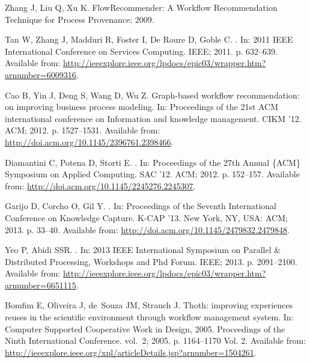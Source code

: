 \documentclass[10pt,letterpaper]{article}
\begin{document}
\begin{thebibliography}{10}
	Zhang J, Liu Q, Xu K. FlowRecommender: A Workflow Recommendation Technique for
	Process Provenance; 2009.
	
	Tan W, Zhang J, Madduri R, Foster I, {De Roure} D, Goble C.
	.
	\newblock In: 2011 IEEE International Conference on Services Computing. IEEE;
	2011. p. 632--639.
	\newblock Available from:
	\url{http://ieeexplore.ieee.org/lpdocs/epic03/wrapper.htm?arnumber=6009316}.
	
	Cao B, Yin J, Deng S, Wang D, Wu Z.
	\newblock Graph-based workflow recommendation: on improving business process
	modeling.
	\newblock In: Proceedings of the 21st ACM international conference on
	Information and knowledge management. CIKM '12. ACM; 2012. p. 1527--1531.
	\newblock Available from: \url{http://doi.acm.org/10.1145/2396761.2398466}.
	
	Diamantini C, Potena D, Storti E.
	.
	\newblock In: Proceedings of the 27th Annual \{ACM\} Symposium on Applied
	Computing. SAC '12. ACM; 2012. p. 152--157.
	\newblock Available from: \url{http://doi.acm.org/10.1145/2245276.2245307}.
	
	Garijo D, Corcho O, Gil Y.
	.
	\newblock In: Proceedings of the Seventh International Conference on Knowledge
	Capture. K-CAP '13. New York, NY, USA: ACM; 2013. p. 33--40.
	\newblock Available from: \url{http://doi.acm.org/10.1145/2479832.2479848}.
	
	Yeo P, Abidi SSR.
	.
	\newblock In: 2013 IEEE International Symposium on Parallel \& Distributed
	Processing, Workshops and Phd Forum. IEEE; 2013. p. 2091--2100.
	\newblock Available from:
	\url{http://ieeexplore.ieee.org/lpdocs/epic03/wrapper.htm?arnumber=6651115}.
	
	Bomfim E, Oliveira J, de~Souza JM, Strauch J.
	\newblock Thoth: improving experiences reuses in the scientific environment
	through workflow management system.
	\newblock In: Computer Supported Cooperative Work in Design, 2005. Proceedings
	of the Ninth International Conference. vol.~2; 2005. p. 1164--1170 Vol. 2.
	\newblock Available from:
	\url{http://ieeexplore.ieee.org/xpl/articleDetails.jsp?arnumber=1504261}.
	

\end{thebibliography}
\end{document}
